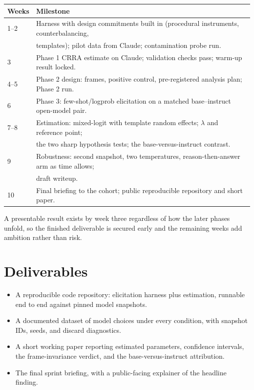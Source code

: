 \documentclass[11pt]{article}
\begin{document}
\begin{center}
\begin{tabular}{@{}ll@{}}
\toprule
\textbf{Weeks} & \textbf{Milestone} \\
\midrule
1--2 & Harness with design commitments built in (procedural instruments, counterbalancing, \\
     & templates); pilot data from Claude; contamination probe run. \\
3    & Phase 1 CRRA estimate on Claude; validation checks pass; warm-up result locked. \\
4--5 & Phase 2 design: frames, positive control, pre-registered analysis plan; Phase 2 run. \\
6    & Phase 3: few-shot/logprob elicitation on a matched base--instruct open-model pair. \\
7--8 & Estimation: mixed-logit with template random effects; $\lambda$ and reference point; \\
     & the two sharp hypothesis tests; the base-versus-instruct contrast. \\
9    & Robustness: second snapshot, two temperatures, reason-then-answer arm as time allows; \\
     & draft writeup. \\
10   & Final briefing to the cohort; public reproducible repository and short paper. \\
\bottomrule
\end{tabular}
\end{center}

A presentable result exists by week three regardless of how the later phases unfold, so the finished
deliverable is secured early and the remaining weeks add ambition rather than risk.

\section{Deliverables}

\begin{itemize}
  \item A reproducible code repository: elicitation harness plus estimation, runnable end to end
  against pinned model snapshots.
  \item A documented dataset of model choices under every condition, with snapshot IDs, seeds, and
  discard diagnostics.
  \item A short working paper reporting estimated parameters, confidence intervals, the frame-invariance
  verdict, and the base-versus-instruct attribution.
  \item The final sprint briefing, with a public-facing explainer of the headline finding.
\end{itemize}
\end{document}
